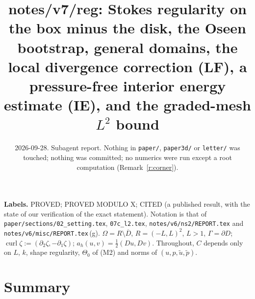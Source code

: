 \documentclass[11pt,reqno]{amsart}
\theoremstyle{plain}
\theoremstyle{definition}
\newcommand{\ut}{\tilde u}
\newcommand{\pt}{\tilde p}
\newcommand{\curl}{\operatorname{curl}}
\begin{document}
\title[notes/v7/reg]{notes/v7/reg: Stokes regularity on the box minus the disk, the Oseen bootstrap, general domains, the local divergence correction (LF), a pressure-free interior energy estimate (IE), and the graded-mesh $L^2$ bound}
\date{2026-09-28. Subagent report. Nothing in \texttt{paper/}, \texttt{paper3d/} or \texttt{letter/} was touched; nothing was committed; no numerics were run except a root computation (Remark~\ref{r:corner}).}
\maketitle

\noindent\textbf{Labels.} PROVED; PROVED MODULO X; CITED (a published result, with the state of our verification of the exact statement). Notation is that of \texttt{paper/sections/02\_setting.tex}, \texttt{07c\_l2.tex}, \texttt{notes/v6/ns2/REPORT.tex} and \texttt{notes/v6/misc/REPORT.tex}\,(g). $\Omega=R\setminus\overline D$, $R=(-L,L)^2$, $L>1$, $\Gamma=\partial D$; $\curl\zeta:=(\partial_2\zeta,-\partial_1\zeta)$; $a_h(u,v)=\frac12(Du,Dv)$. Throughout, $C$ depends only on $L$, $k$, shape regularity, $\Theta_0$ of (M2) and norms of $(u,p,\ut,\pt)$.

\section*{Summary}
\end{document}
